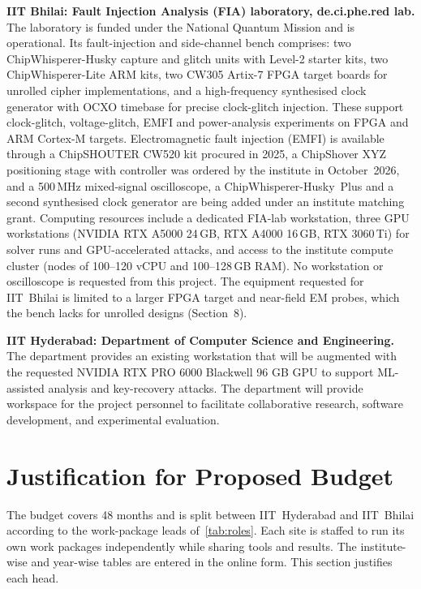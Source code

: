 \textbf{IIT Bhilai: Fault Injection Analysis (FIA) laboratory, de.ci.phe.red lab.}
The laboratory is funded under the National Quantum Mission and is operational.
Its fault-injection and side-channel bench comprises:
two ChipWhisperer-Husky capture and glitch units with Level-2 starter kits, two ChipWhisperer-Lite ARM kits, two CW305 Artix-7 FPGA target boards for unrolled cipher implementations, and a high-frequency synthesised clock generator with OCXO timebase for precise clock-glitch injection.
These support clock-glitch, voltage-glitch, EMFI and power-analysis experiments on FPGA and ARM Cortex-M targets.
Electromagnetic fault injection (EMFI) is available through a ChipSHOUTER CW520 kit procured in 2025, a ChipShover XYZ positioning stage with controller was ordered by the institute in October~2026, and a 500\,MHz mixed-signal oscilloscope, a ChipWhisperer-Husky~Plus and a second synthesised clock generator are being added under an institute matching grant.
Computing resources include a dedicated FIA-lab workstation, three GPU workstations (NVIDIA RTX A5000 24\,GB, RTX A4000 16\,GB, RTX 3060\,Ti) for solver runs and GPU-accelerated attacks, and access to the institute compute cluster (nodes of 100--120 vCPU and 100--128\,GB RAM).
No workstation or oscilloscope is requested from this project. The equipment requested for IIT~Bhilai is limited to a larger FPGA target and near-field EM probes, which the bench lacks for unrolled designs (Section~8).

\textbf{IIT Hyderabad: Department of Computer Science and Engineering.}
The department provides an existing workstation that will be augmented with the requested NVIDIA RTX PRO 6000 Blackwell 96 GB GPU to support ML-assisted analysis and key-recovery attacks. The department will provide workspace for the project personnel to facilitate collaborative research, software development, and experimental evaluation.


\section{Justification for Proposed Budget}

The budget covers 48 months and is split between IIT~Hyderabad and IIT~Bhilai according to the work-package leads of~\cref{tab:roles}.
Each site is staffed to run its own work packages independently while sharing tools and results.
The institute-wise and year-wise tables are entered in the online form. This section justifies each head.

